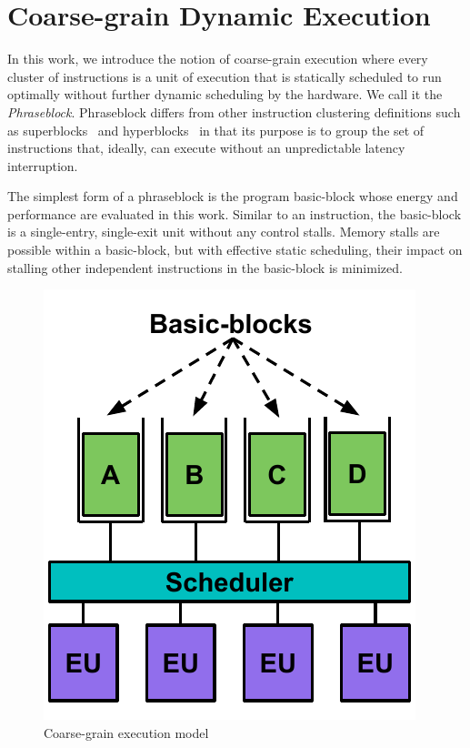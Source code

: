 \section{Coarse-grain Dynamic Execution}
\label{sec:course_grain}

In this work, we introduce the notion of coarse-grain execution where every
cluster of instructions is a unit of execution that is statically scheduled to
run optimally without further dynamic scheduling by the hardware. We call it the
{\it{Phraseblock}}. Phraseblock differs from other instruction clustering
definitions such as superblocks~\cite{superblock} and
hyperblocks~\cite{hyperblock} in that its purpose is to group the set of
instructions that, ideally, can execute without an unpredictable latency
interruption. 

The simplest form of a phraseblock is the program basic-block whose energy and
performance are evaluated in this work. Similar to an instruction, the
basic-block is a single-entry, single-exit unit without any control stalls.
Memory stalls are possible within a basic-block, but with effective static
scheduling, their impact on stalling other independent instructions in the
basic-block is minimized.

\begin{figure}
	\centering
	\includegraphics[width=0.5\columnwidth]{fig/coarse_grain_sch.pdf} 
	\caption{Coarse-grain execution model}
	\label{fig:coarse_grain_sch}
\end{figure}

